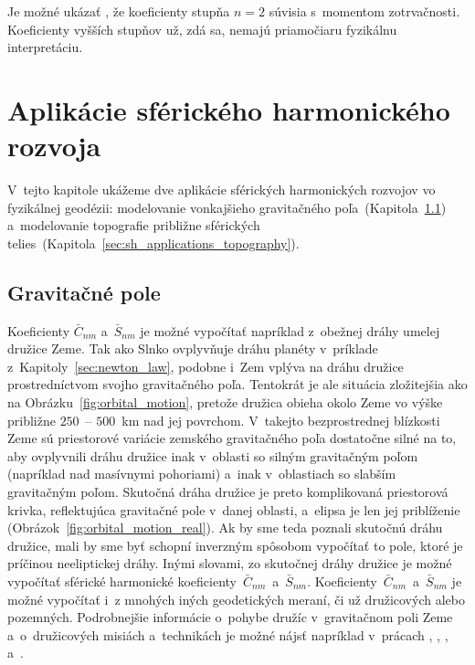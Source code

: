 \documentclass[a4paper, 12pt]{book}
\begin{document}
Je možné ukázať \parencite[napríklad][]{MoritzPhysicalGeodesy}, že koeficienty
stupňa $n = 2$ súvisia s~momentom zotrvačnosti.  Koeficienty vyšších stupňov
už, zdá sa, nemajú priamočiaru fyzikálnu interpretáciu.







\section{Aplikácie sférického harmonického rozvoja}
\label{sec:spherical_harmonics_applications}

V~tejto kapitole ukážeme dve aplikácie sférických harmonických rozvojov vo 
fyzikálnej geodézii: modelovanie vonkajšieho gravitačného 
poľa~(Kapitola~\ref{sec:sh_applications_gravity_field})
a~modelovanie topografie približne sférických 
telies~(Kapitola~\ref{sec:sh_applications_topography}).

\subsection{Gravitačné pole}
\label{sec:sh_applications_gravity_field}

Koeficienty $\bar{C}_{nm}$ a~$\bar{S}_{nm}$ je možné vypočítať napríklad 
z~obežnej dráhy umelej družice Zeme.  Tak ako Slnko ovplyvňuje dráhu planéty 
v~príklade z~Kapitoly~\ref{sec:newton_law}, podobne i~Zem vplýva na dráhu 
družice prostredníctvom svojho gravitačného poľa.  Tentokrát je ale situácia 
zložitejšia ako na Obrázku~\ref{fig:orbital_motion}, pretože družica obieha 
okolo Zeme vo výške približne $250$~-- $500$~km nad jej povrchom.  V~takejto 
bezprostrednej blízkosti Zeme sú priestorové variácie zemského gravitačného 
poľa dostatočne silné na to, aby ovplyvnili dráhu družice inak v~oblasti so 
silným gravitačným poľom (napríklad nad masívnymi pohoriami) a~inak 
v~oblastiach so slabším gravitačným poľom.  Skutočná dráha družice je preto 
komplikovaná priestorová krivka, reflektujúca gravitačné pole v~danej oblasti, 
a~elipsa je len jej priblíženie (Obrázok~\ref{fig:orbital_motion_real}).  Ak by 
sme teda poznali skutočnú dráhu družice, mali by sme byť schopní inverzným 
spôsobom vypočítať to pole, ktoré je príčinou neeliptickej dráhy.  Inými 
slovami, zo skutočnej dráhy družice je možné vypočítať sférické harmonické 
koeficienty~$\bar{C}_{nm}$~a~$\bar{S}_{nm}$.  
Koeficienty~$\bar{C}_{nm}$~a~$\bar{S}_{nm}$ je možné vypočítať i~z mnohých 
iných geodetických meraní, či už družicových alebo pozemných.  Podrobnejšie 
informácie o~pohybe družíc v~gravitačnom poli Zeme a~o~družicových misiách 
a~technikách je možné nájsť napríklad v~prácach 
\textcite{SeeberSatelliteGeodesy}, \textcite{MoritzPhysicalGeodesy}, 
\textcite{Kostelecky2008}, \textcite{Melicher2009} a~\textcite{Husar2017}.
\end{document}

